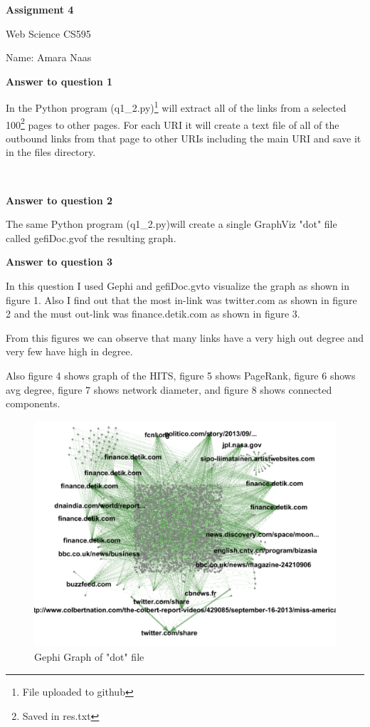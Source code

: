 \documentclass[a4paper,12pt]{article}
\begin{document}
\begin{center}
\begin{Large}


\textbf{Assignment 4}

Web Science CS595

Name: Amara Naas
\end{Large}
\end{center}
\pagebreak

\textbf{Answer to question 1}\par
In the Python program (q1\_2.py)\footnote{File uploaded to github} will  extract all of the links from a selected 100\footnote{Saved in res.txt} pages to other pages. For each URI it will create a text file of all of the outbound links from that page to other URIs including the main URI and save it in the files directory\footnotemark[1].
\par

$\:$

\textbf{Answer to question 2}\par
The same Python program (q1\_2.py)\footnotemark[1] will create a single GraphViz "dot" file called gefiDoc.gv\footnotemark[1] of the resulting graph.\par




\textbf{Answer to question 3}\par
In this question I used Gephi and gefiDoc.gv\footnotemark[1] to visualize the graph as shown in figure 1. Also I find out that the most in-link was twitter.com as shown in figure 2 and the must out-link was finance.detik.com as shown in figure 3.
$\:$

From this figures we can observe that many links have a very high out degree and very few have high in degree. 

Also figure 4 shows graph of the HITS, figure 5 shows PageRank, figure 6 shows avg degree, figure 7 shows network diameter, and figure 8 shows connected components.
$\:$



\pagebreak
\begin{figure}
\center
\includegraphics[width=\linewidth]{MainGraph.png} 
\caption{Gephi Graph of "dot" file}
\end{figure}
\end{document}
